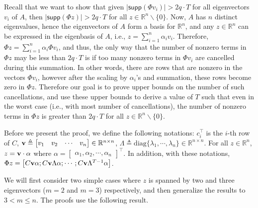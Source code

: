 \documentclass[../thesis.tex]{subfiles}
\begin{document}
Recall that we want to show that given $\lvert \textsf{supp} (\Phi v_i) \rvert > 2q\cdot T $ for all eigenvectors $v_i$ of $A$, then $\lvert \textsf{supp} (\Phi z) \rvert > 2q\cdot T $ for all $z \in \mathbb{R}^n \backslash \{0\}$. Now, $A$ has $n$ distinct eigenvalues, hence the eigenvectors of $A$ form a basis for $\mathbb{R}^n$, and any $z \in \mathbb{R}^n$ can be expressed in the eigenbasis of $A$, i.e., $ z = \sum_{i=1}^n \alpha_i v_i$. Therefore, $\Phi z = \sum_{i=1}^n \alpha_i \Phi v_i$, and thus, the only way that the number of nonzero terms in $\Phi z$ may be less than $2q\cdot T$ is if too many nonzero terms in $\Phi v_i$ are cancelled during this summation. 
In other words, there are rows that are nonzero in the vectors $\Phi v_i$, however after the scaling by $\alpha_i$'s and summation, these rows become zero in $\Phi z$. Therefore our goal is to prove upper bounds on the number of such cancellations, and use these upper bounds to derive a value of $T$ such that even in the worst case (i.e., with most number of cancellations), the number of nonzero terms in $\Phi z$ is greater than $2q\cdot T$ for all $z \in \mathbb{R}^n \backslash \{0\}$.

Before we present the proof, we define the following notations: $c_i^\top$ is the $i$-th row of $C$, ${\bf v} \triangleq \begin{bmatrix} v_1 & v_2 & \cdots & v_n \end{bmatrix} \in \mathbb{R}^{n \times n}$, $\Lambda \triangleq \text{diag}\{ \lambda_1, \cdots , \lambda_n \} \in \mathbb{R}^{n \times n}$. %
For all $z \in \mathbb{R}^n$, $ z = {\bf v} \cdot \alpha$ where $\alpha = \begin{bmatrix} \alpha_1, \alpha_2, \cdots, \alpha_n \end{bmatrix}^\top $.
In addition, with these notations, $\Phi z = \begin{bmatrix} C {\bf v} \alpha; C {\bf v} \Lambda \alpha; \cdots; C {\bf v} \Lambda^{T-1} \alpha \end{bmatrix}$.

We will first consider two simple cases where $z$ is spanned by two and three eigenvectors ($m = 2$ and $m =3 $) respectively, and then generalize the results to $3 < m \leq n$. The proofs use the following result.
\end{document}
